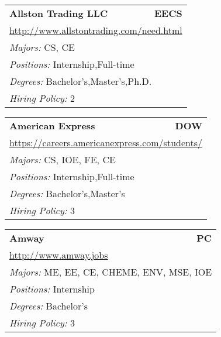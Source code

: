 \documentclass[twoside]{article}
\begin{document}
\begin{center}
\begin{multicols}{3}
\begin{FlushLeft}
\begin{minipage}{.9\columnwidth}
\end{minipage}
 
\begin{minipage}{.9\columnwidth}\begin{tabularx}{.95\columnwidth}{Xr}
                 {\Large\bf Allston Trading LLC} & {\Large\bf EECS}\\
    \multicolumn{2}{p{.95\columnwidth}}{\url{http://www.allstontrading.com/need.html}}\\
    \multicolumn{2}{p{.95\columnwidth}}{\emph{Majors:} CS, CE}\\
    \multicolumn{2}{p{.95\columnwidth}}{\emph{Positions:} Internship,Full-time}\\
    \multicolumn{2}{p{.95\columnwidth}}{\emph{Degrees:} Bachelor's,Master's,Ph.D.}\\
    \multicolumn{2}{p{.95\columnwidth}}{\emph{Hiring Policy:} 2}\\
    \end{tabularx}
    
\end{minipage}
 
\begin{minipage}{.9\columnwidth}\begin{tabularx}{.95\columnwidth}{Xr}
                 {\Large\bf American Express} & {\Large\bf DOW}\\
    \multicolumn{2}{p{.95\columnwidth}}{\url{https://careers.americanexpress.com/students/}}\\
    \multicolumn{2}{p{.95\columnwidth}}{\emph{Majors:} CS, IOE, FE, CE}\\
    \multicolumn{2}{p{.95\columnwidth}}{\emph{Positions:} Internship,Full-time}\\
    \multicolumn{2}{p{.95\columnwidth}}{\emph{Degrees:} Bachelor's,Master's}\\
    \multicolumn{2}{p{.95\columnwidth}}{\emph{Hiring Policy:} 3}\\
    \end{tabularx}
    
\end{minipage}
 
\begin{minipage}{.9\columnwidth}\begin{tabularx}{.95\columnwidth}{Xr}
                 {\Large\bf Amway} & {\Large\bf PC}\\
    \multicolumn{2}{p{.95\columnwidth}}{\url{http://www.amway.jobs}}\\
    \multicolumn{2}{p{.95\columnwidth}}{\emph{Majors:} ME, EE, CE, CHEME, ENV, MSE, IOE}\\
    \multicolumn{2}{p{.95\columnwidth}}{\emph{Positions:} Internship}\\
    \multicolumn{2}{p{.95\columnwidth}}{\emph{Degrees:} Bachelor's}\\
    \multicolumn{2}{p{.95\columnwidth}}{\emph{Hiring Policy:} 3}\\
    \end{tabularx}
    

\end{minipage}
\end{FlushLeft}
\end{multicols}
\end{center}
\end{document}
